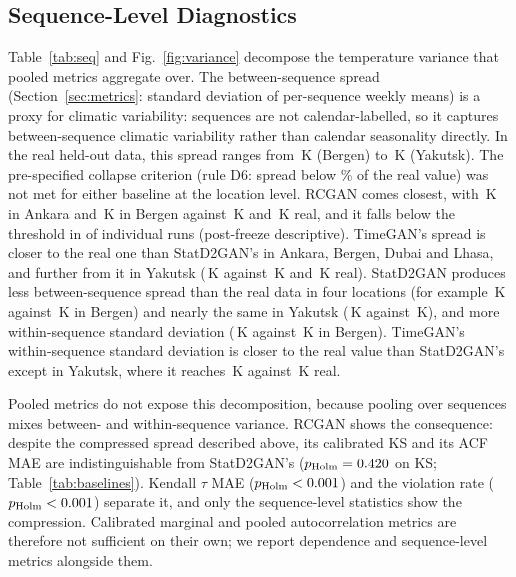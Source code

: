 \documentclass[preprint,12pt]{elsarticle}
\begin{document}
\subsection{Sequence-Level Diagnostics}
\label{sec:results_seq}

Table~\ref{tab:seq} and Fig.~\ref{fig:variance} decompose the
temperature variance that pooled metrics aggregate over.  The
between-sequence spread (Section~\ref{sec:metrics}: standard
deviation of per-sequence weekly means) is a proxy for climatic variability: sequences are not calendar-labelled, so it captures
between-sequence climatic variability rather than calendar seasonality
directly. In the real
held-out data, this spread ranges from \SeqSdRealBergen\,K (Bergen) to \SeqSdRealYakutsk\,K
(Yakutsk).
The pre-specified collapse criterion (rule D6: spread below
\protoDSixPct\% of the real value) was not met for either baseline at
the location level.  RCGAN comes closest, with \SeqSdRcganAnkara\,K in
Ankara and \SeqSdRcganBergen\,K in Bergen against \SeqSdRealAnkara\,K and
\SeqSdRealBergen\,K real, and it falls below the threshold in
\phSeedsBelowTenRcgan{} of \phSeedsPerModel{} individual runs (post-freeze
descriptive).  TimeGAN's spread is closer to the real one than
StatD2GAN's in Ankara, Bergen, Dubai and Lhasa, and further from it in
Yakutsk (\SeqSdTimeganYakutsk\,K against \SeqSdStatYakutsk\,K and
\SeqSdRealYakutsk\,K real).  StatD2GAN produces less between-sequence
spread than the real data in four locations (for example
\SeqSdStatBergen\,K against \SeqSdRealBergen\,K in Bergen) and nearly the
same in Yakutsk (\SeqSdStatYakutsk\,K against \SeqSdRealYakutsk\,K), and more
within-sequence standard deviation (\WithinSdStatBergen\,K against
\WithinSdRealBergen\,K in Bergen).  TimeGAN's within-sequence standard
deviation is closer to the real value than StatD2GAN's except in Yakutsk,
where it reaches \WithinSdTimeganYakutsk\,K against
\WithinSdRealYakutsk\,K real.

Pooled metrics do not expose this decomposition, because pooling over
sequences mixes between- and within-sequence variance.  RCGAN shows the
consequence: despite the compressed spread described above, its calibrated KS
and its ACF MAE are indistinguishable from StatD2GAN's
($p_{\mathrm{Holm}}=0.420$ on KS; Table~\ref{tab:baselines}).
Kendall $\tau$ MAE ($p_{\mathrm{Holm}}<0.001$) and the
violation rate ($p_{\mathrm{Holm}}<0.001$) separate it, and
only the sequence-level statistics show the compression.  Calibrated
marginal and pooled autocorrelation metrics are therefore not sufficient
on their own; we report dependence and sequence-level metrics alongside
them.
\end{document}
